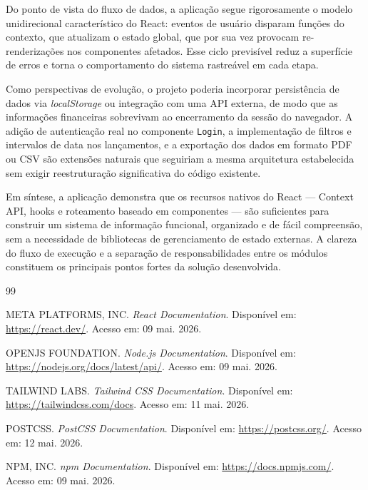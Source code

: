 \documentclass{article}
\begin{document}
Do ponto de vista do fluxo de dados, a aplicação segue rigorosamente o modelo unidirecional característico do React: eventos de usuário disparam funções do contexto, que atualizam o estado global, que por sua vez provocam re-renderizações nos componentes afetados. Esse ciclo previsível reduz a superfície de erros e torna o comportamento do sistema rastreável em cada etapa.

Como perspectivas de evolução, o projeto poderia incorporar persistência de dados via \textit{localStorage} ou integração com uma API externa, de modo que as informações financeiras sobrevivam ao encerramento da sessão do navegador. A adição de autenticação real no componente \texttt{Login}, a implementação de filtros e intervalos de data nos lançamentos, e a exportação dos dados em formato PDF ou CSV são extensões naturais que seguiriam a mesma arquitetura estabelecida sem exigir reestruturação significativa do código existente.

Em síntese, a aplicação demonstra que os recursos nativos do React — Context API, hooks e roteamento baseado em componentes — são suficientes para construir um sistema de informação funcional, organizado e de fácil compreensão, sem a necessidade de bibliotecas de gerenciamento de estado externas. A clareza do fluxo de execução e a separação de responsabilidades entre os módulos constituem os principais pontos fortes da solução desenvolvida.

\clearpage
\begin{thebibliography}{99}

META PLATFORMS, INC.
\textit{React Documentation}.
Disponível em: \url{https://react.dev/}.
Acesso em: 09 mai. 2026.

OPENJS FOUNDATION.
\textit{Node.js Documentation}.
Disponível em: \url{https://nodejs.org/docs/latest/api/}.
Acesso em: 09 mai. 2026.

TAILWIND LABS.
\textit{Tailwind CSS Documentation}.
Disponível em: \url{https://tailwindcss.com/docs}.
Acesso em: 11 mai. 2026.

POSTCSS.
\textit{PostCSS Documentation}.
Disponível em: \url{https://postcss.org/}.
Acesso em: 12 mai. 2026.

NPM, INC.
\textit{npm Documentation}.
Disponível em: \url{https://docs.npmjs.com/}.
Acesso em: 09 mai. 2026.

\end{thebibliography}
\end{document}

